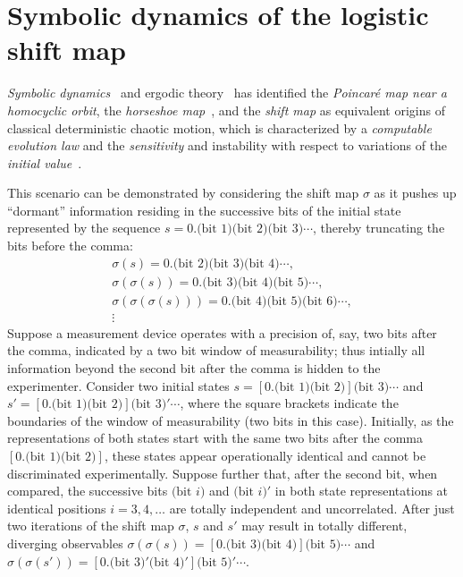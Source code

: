\section{Symbolic dynamics of the logistic shift map}

 {\em Symbolic dynamics}~\cite{LindMarcus95,Kitchens-sd,bailin-esdcds}
and ergodic theory~\cite{pe-83,eckmann1,Cornfeld-F-S}
has identified the
 {\em Poincar{\'e} map near a homocyclic orbit},
the {\em horseshoe map}~\cite{smale-hm},
and the {\em shift map}
as equivalent origins of classical deterministic chaotic motion,
which is characterized by a {\em computable evolution law}
and the {\em sensitivity}  and instability with respect to variations of the
{\em initial value}~\cite{shaw,li-83,nld-chaos}.

This scenario can be demonstrated by considering the shift map $\sigma$ as it
pushes up ``dormant'' information residing in the successive bits of the initial state represented by the sequence
$s=0.\text{(bit~1)}\text{(bit~2)}\text{(bit~3)}\cdots$,
thereby truncating the bits before the comma:
\begin{equation}
\begin{split}
\sigma (s)= 0.\text{(bit~2)}\text{(bit~3)}\text{(bit~4)}\cdots,\\
\sigma (\sigma (s))= 0.\text{(bit~3)}\text{(bit~4)}\text{(bit~5)}\cdots,  \\
\sigma (\sigma (\sigma (s)))= 0.\text{(bit~4)}\text{(bit~5)}\text{(bit~6)}\cdots,  \\
 \vdots
\end{split}
\end{equation}
Suppose a measurement device operates with a precision of, say, two bits after the comma,
indicated by a two bit window of measurability;  thus intially
all information beyond the second bit after the comma is hidden to the experimenter.
Consider two initial states
$s=[0.\text{(bit~1)}\text{(bit~2)}] \text{(bit~3)}\cdots$ and
$s'=[0.\text{(bit~1)}\text{(bit~2)}] \text{(bit~3)}'\cdots$,
where the square brackets
indicate the boundaries of the window of measurability (two bits in this case).
Initially, as the representations of both states start with the same two bits after the comma
$[0.\text{(bit~1)}\text{(bit~2)}]$,
these states appear operationally identical and cannot be discriminated experimentally.
Suppose further that, after the second bit, when compared,
the successive bits
$\text{(bit }i\text{)}$ and $\text{(bit }i\text{)}'$
in both state representations at identical positions $i=3,4,\ldots$ are totally
independent and uncorrelated.
After just two iterations of the shift map $\sigma$, $s$ and
$s'$
may result in totally  different, diverging observables
$\sigma (\sigma (s))= [0.\text{(bit~3)}\text{(bit~4)}]\text{(bit~5)}\cdots$
and
$\sigma (\sigma (s'))= [0.\text{(bit~3)}'\text{(bit~4)}']\text{(bit~5)}'\cdots$.

